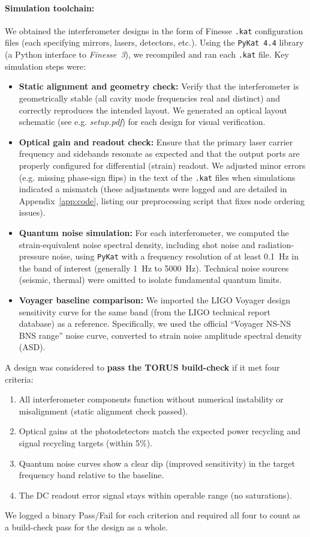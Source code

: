 \documentclass{article}
\begin{document}
\paragraph{Simulation toolchain:} We obtained the interferometer designs in the form of Finesse \texttt{.kat} configuration files (each specifying mirrors, lasers, detectors, etc.). Using the \texttt{PyKat 4.4} library (a Python interface to \emph{Finesse~3}), we recompiled and ran each \texttt{.kat} file. Key simulation steps were:
\begin{itemize}\itemsep 0pt
    \item \textbf{Static alignment and geometry check:} Verify that the interferometer is geometrically stable (all cavity mode frequencies real and distinct) and correctly reproduces the intended layout. We generated an optical layout schematic (see e.g. \emph{setup.pdf}) for each design for visual verification.
    \item \textbf{Optical gain and readout check:} Ensure that the primary laser carrier frequency and sidebands resonate as expected and that the output ports are properly configured for differential (strain) readout. We adjusted minor errors (e.g. missing phase-sign flips) in the text of the \texttt{.kat} files when simulations indicated a mismatch (these adjustments were logged and are detailed in Appendix~\ref{app:code}, listing our preprocessing script that fixes node ordering issues).
    \item \textbf{Quantum noise simulation:} For each interferometer, we computed the strain-equivalent noise spectral density, including shot noise and radiation-pressure noise, using \texttt{PyKat} with a frequency resolution of at least 0.1~Hz in the band of interest (generally 1~Hz to 5000~Hz). Technical noise sources (seismic, thermal) were omitted to isolate fundamental quantum limits.
    \item \textbf{Voyager baseline comparison:} We imported the LIGO Voyager design sensitivity curve for the same band (from the LIGO technical report database) as a reference. Specifically, we used the official ``Voyager NS-NS BNS range'' noise curve, converted to strain noise amplitude spectral density (ASD).
\end{itemize}

A design was considered to \textbf{pass the TORUS build-check} if it met four criteria:
\begin{enumerate}\itemsep 0pt
    \item All interferometer components function without numerical instability or misalignment (static alignment check passed).
    \item Optical gains at the photodetectors match the expected power recycling and signal recycling targets (within 5\%).
    \item Quantum noise curves show a clear dip (improved sensitivity) in the target frequency band relative to the baseline.
    \item The DC readout error signal stays within operable range (no saturations).
\end{enumerate}
We logged a binary Pass/Fail for each criterion and required all four to count as a build-check pass for the design as a whole.
\end{document}
